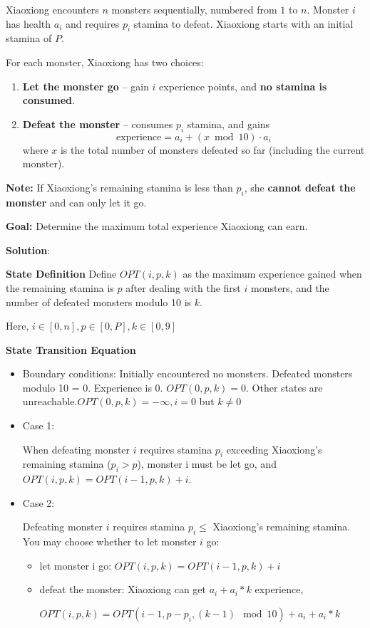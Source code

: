 \problem{}
Xiaoxiong encounters $n$ monsters sequentially, numbered from $1$ to $n$. Monster $i$ has health $a_i$ and requires $p_i$ stamina to defeat. Xiaoxiong starts with an initial stamina of $P$.

For each monster, Xiaoxiong has two choices:

\begin{enumerate}
    \item \textbf{Let the monster go} -- gain $i$ experience points, and \textbf{no stamina is consumed}.
    \item \textbf{Defeat the monster} -- consumes $p_i$ stamina, and gains
    \[
        \text{experience} = a_i + (x \bmod 10) \cdot a_i
    \]
    where $x$ is the total number of monsters defeated so far (including the current monster).
\end{enumerate}

\textbf{Note:} If Xiaoxiong's remaining stamina is less than $p_i$, she \textbf{cannot defeat the monster} and can only let it go.

\textbf{Goal:} Determine the maximum total experience Xiaoxiong can earn.

\newpage
\noindent \textbf{Solution}:

\noindent \textbf{State Definition} Define $OPT(i,p,k)$ as 
the maximum experience gained when the remaining stamina is $p$ after dealing with the first $i$ monsters, and the number of defeated monsters modulo 10 is $k$.

Here, $i \in [0,n],p \in [0,P], k \in [0,9]$

\noindent \textbf{State Transition Equation}
\begin{itemize}
   \item Boundary conditions: Initially encountered no monsters. 
   Defeated monsters modulo 10 = 0. Experience is 0. $OPT(0,p,k)=0$. Other states are unreachable.$OPT(0,p,k)=-\infty,i=0$ but $k \neq 0$
   \item Case 1: 
   
   When defeating monster $i$ requires stamina $p_i$ exceeding Xiaoxiong's remaining stamina ($p_i > p$), monster i must be let go, and $OPT(i, p,k) = OPT(i-1, p,k) + i$.   
   \item Case 2: 
   
    Defeating monster $i$ requires stamina $p_i \leq$  Xiaoxiong's remaining stamina. You may choose whether to let monster $i$ go:     
    \begin{itemize}
        \item let monster i go: $OPT(i, p,k) = OPT(i-1, p,k) + i$
        \item defeat the monster: Xiaoxiong can get
        $ a_i + a_i * k$ experience,
        
        $OPT(i, p,k) =OPT(i-1,p-p_i,(k-1) \mod 10)+ a_i + a_i * k$
    \end{itemize}
\end{itemize}

